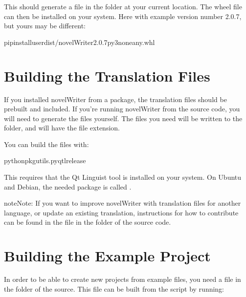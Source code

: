 \documentclass[a4paper,11pt,english]{sphinxmanual}
\begin{document}
\sphinxAtStartPar
This should generate a  file in the  folder at your current location. The wheel
file can then be installed on your system. Here with example version number 2.0.7, but yours may be
different:

\begin{sphinxVerbatim}[commandchars=\\\{\}]
pipinstall\PYGZhy{}\PYGZhy{}userdist/novelWriter\PYGZhy{}2.0.7\PYGZhy{}py3\PYGZhy{}none\PYGZhy{}any.whl
\end{sphinxVerbatim}


\section{Building the Translation Files}
\label{\detokenize{tech_source:building-the-translation-files}}\label{\detokenize{tech_source:a-source-i18n}}
\sphinxAtStartPar
If you installed novelWriter from a package, the translation files should be pre\sphinxhyphen{}built and
included. If you’re running novelWriter from the source code, you will need to generate the files
yourself. The files you need will be written to the  folder, and will
have the  file extension.

\sphinxAtStartPar
You can build the  files with:

\begin{sphinxVerbatim}[commandchars=\\\{\}]
pythonpkgutils.pyqtlrelease
\end{sphinxVerbatim}

\sphinxAtStartPar
This requires that the Qt Linguist tool is installed on your system. On Ubuntu and Debian, the
needed package is called .

\begin{sphinxadmonition}{note}{Note:}
\sphinxAtStartPar
If you want to improve novelWriter with translation files for another language, or update an
existing translation, instructions for how to contribute can be found in the  file
in the  folder of the source code.
\end{sphinxadmonition}


\section{Building the Example Project}
\label{\detokenize{tech_source:building-the-example-project}}\label{\detokenize{tech_source:a-source-sample}}
\sphinxAtStartPar
In order to be able to create new projects from example files, you need a  file in
the  folder of the source. This file can be built from the  script by
running:
\end{document}
